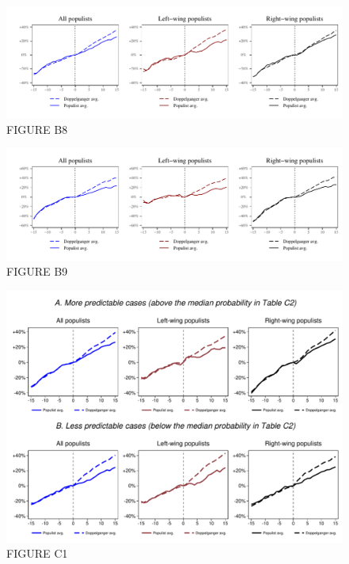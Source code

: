 \documentclass{article}
\begin{document}
\clearpage

\begin{figure}	
	\caption{FIGURE B8} 
		\includegraphics[scale=0.8]{FigureB8}\centering	
\end{figure}

\clearpage

\begin{figure}	
	\caption{FIGURE B9} 
		\includegraphics[scale=0.8]{FigureB9}\centering	
\end{figure}

\clearpage

\begin{figure}	
	\caption{FIGURE C1} 
		\includegraphics[scale=0.5]{FigureC1}\centering	
\end{figure}
\end{document}
